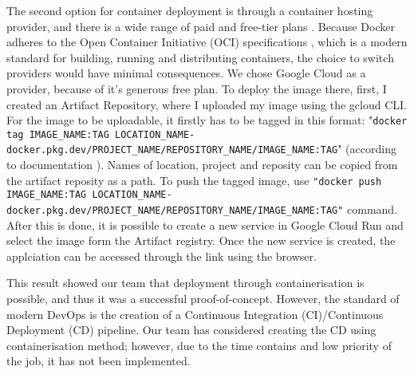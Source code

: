 The second option for container deployment is through a container hosting provider, and there is a wide range of paid and free-tier plans \cite{dockerDeploymentServices}. Because Docker adheres to the Open Container Initiative (OCI) specifications \cite{OCIdocker}, which is a modern standard for building, running and distributing containers, the choice to switch providers would have minimal consequences. We chose Google Cloud as a provider, because of it's generous free plan. To deploy the image there, first, I created an Artifact Repository, where I uploaded my image using the gcloud CLI. For the image to be uploadable, it firstly has to be tagged in this format: "\lstinline|docker tag IMAGE_NAME:TAG LOCATION_NAME-docker.pkg.dev/PROJECT_NAME/REPOSITORY_NAME/IMAGE_NAME:TAG|" (according to documentation \cite{GoogleCloudRunDocs}). Names of location, project and reposity can be copied from the artifact reposity as a path. To push the tagged image, use \lstinline|"docker push IMAGE_NAME:TAG LOCATION_NAME-docker.pkg.dev/PROJECT_NAME/REPOSITORY_NAME/IMAGE_NAME:TAG"| command. After this is done, it is possible to create a new service in Google Cloud Run and select the image form the Artifact registry. Once the new service is created, the applciation can be accessed through the link using the browser. 

This result showed our team that deployment through containerisation is possible, and thus it was a successful proof-of-concept. However, the standard of modern DevOps is the creation of a Continuous Integration (CI)/Continuous Deployment (CD) pipeline. Our team has considered creating the CD using containerisation method; however, due to the time contains and low priority of the job, it has not been implemented.
